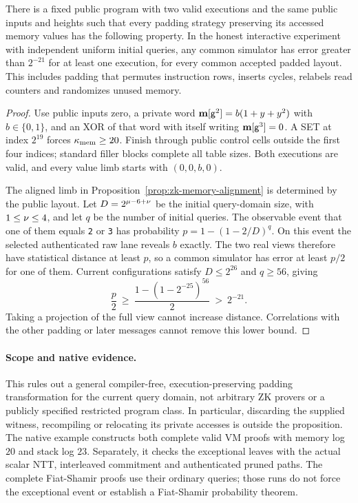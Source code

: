 \begin{proposition}\label{prop:zk-memory-floor}
There is a fixed public program with two valid executions and the same public inputs and heights such that every padding strategy preserving its accessed memory values has the following property. In the honest interactive experiment with independent uniform initial queries, any common simulator has error greater than $2^{-21}$ for at least one execution, for every common accepted padded layout. This includes padding that permutes instruction rows, inserts cycles, relabels read counters and randomizes unused memory.
\end{proposition}
\begin{proof}
Use public inputs zero, a private word $\mathbf{m}[\mathsf{g}^2]=b(1+y+y^2)$ with $b\in\{0,1\}$, and an XOR of that word with itself writing $\mathbf{m}[\mathsf{g}^3]=0$. A SET at index $2^{19}$ forces $\kappa_{\mathrm{mem}}\ge20$. Finish through public control cells outside the first four indices; standard filler blocks complete all table sizes. Both executions are valid, and every value limb starts with $(0,0,b,0)$.

The aligned limb in Proposition~\ref{prop:zk-memory-alignment} is determined by the public layout. Let $D=2^{\mu-6+\nu}$ be the initial query-domain size, with $1\le\nu\le4$, and let $q$ be the number of initial queries. The observable event that one of them equals \texttt{2} or \texttt{3} has probability $p=1-(1-2/D)^q$. On this event the selected authenticated raw lane reveals $b$ exactly. The two real views therefore have statistical distance at least $p$, so a common simulator has error at least $p/2$ for one of them. Current configurations satisfy $D\le2^{26}$ and $q\ge56$, giving
\[
 \frac p2\ \ge\ \frac{1-(1-2^{-25})^{56}}2\ >\ 2^{-21}.
\]
Taking a projection of the full view cannot increase distance. Correlations with the other padding or later messages cannot remove this lower bound.
\end{proof}

\paragraph{Scope and native evidence.} This rules out a general compiler-free, execution-preserving padding transformation for the current query domain, not arbitrary ZK provers or a publicly specified restricted program class. In particular, discarding the supplied witness, recompiling or relocating its private accesses is outside the proposition. The native example  constructs both complete valid VM proofs with memory log $20$ and stack log $23$. Separately, it checks the exceptional leaves with the actual scalar NTT, interleaved commitment and authenticated pruned paths. The complete Fiat-Shamir proofs use their ordinary queries; those runs do not force the exceptional event or establish a Fiat-Shamir probability theorem.

